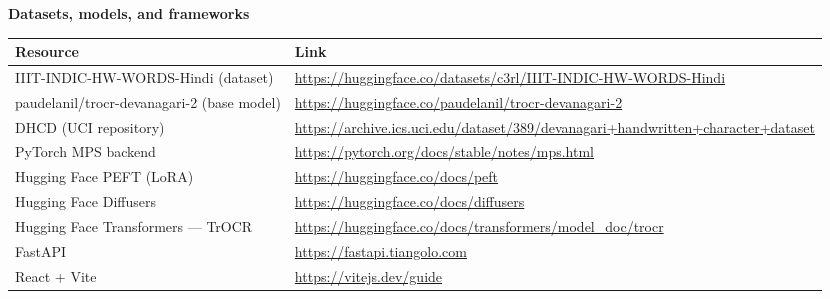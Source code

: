 \documentclass[12pt,a4paper]{report}
\begin{document}
\textbf{Datasets, models, and frameworks}

\begin{longtable}{p{6.2cm}p{8cm}}
\toprule
\textbf{Resource} & \textbf{Link} \\
\midrule
IIIT-INDIC-HW-WORDS-Hindi (dataset) & \url{https://huggingface.co/datasets/c3rl/IIIT-INDIC-HW-WORDS-Hindi} \\
paudelanil/trocr-devanagari-2 (base model) & \url{https://huggingface.co/paudelanil/trocr-devanagari-2} \\
DHCD (UCI repository) & \url{https://archive.ics.uci.edu/dataset/389/devanagari+handwritten+character+dataset} \\
PyTorch MPS backend & \url{https://pytorch.org/docs/stable/notes/mps.html} \\
Hugging Face PEFT (LoRA) & \url{https://huggingface.co/docs/peft} \\
Hugging Face Diffusers & \url{https://huggingface.co/docs/diffusers} \\
Hugging Face Transformers --- TrOCR & \url{https://huggingface.co/docs/transformers/model_doc/trocr} \\
FastAPI & \url{https://fastapi.tiangolo.com} \\
React + Vite & \url{https://vitejs.dev/guide} \\
\bottomrule
\end{longtable}
\end{document}

